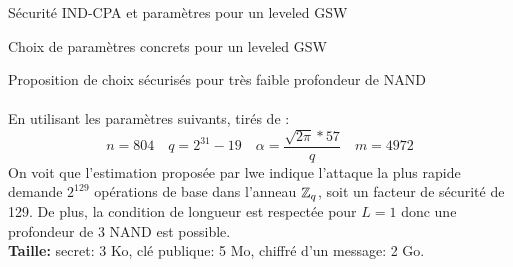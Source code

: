 \begin{section}{Sécurité IND-CPA et paramètres pour un leveled GSW}
\begin{subsection}{Choix de paramètres concrets pour un leveled GSW}
\begin{subsubsection}{Proposition de choix sécurisés pour très faible profondeur de NAND}
\paragraph{}
En utilisant les paramètres suivants, tirés de \cite{cryptoeprint:2015:755}:
\[n = 804\quad  q = 2^{31} - 19\quad \alpha = \frac{\sqrt{2\pi}*57}{q} \quad m = 4972\]
On voit que l'estimation proposée par lwe indique  l'attaque la plus rapide demande $2^{129}$ opérations de base dans
l'anneau $\mathbb{Z}_q$, soit un facteur de sécurité de 129. De plus, la condition de longueur
est respectée pour $L=1$ donc une profondeur de 3 NAND est possible. \\ 
\textbf{Taille:} secret: 3 Ko, clé publique: 5 Mo, chiffré d'un message: 2 Go.
\end{subsubsection}
\end{subsection}
\end{section}
